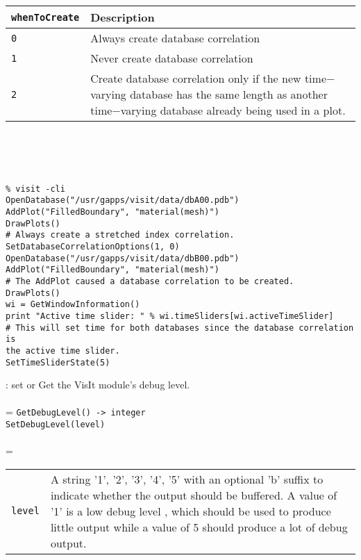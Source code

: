 \documentclass[10pt,a4paper]{report}
\begin{document}
\begin{tabular}{|l|p{9cm}|}
\hline
\verb!whenToCreate! & Description \\
\hline \hline
\verb!0! & Always create database correlation \\
\verb!1! & Never create database correlation \\
\verb!2! & Create database correlation only if the new time$-$varying database has the same length as another time$-$varying database already being used in a plot. \\
\hline
\end{tabular} \\[-2mm]
\\[-3mm] 

\\[-6mm]
\begin{verbatim}% visit -cli
OpenDatabase("/usr/gapps/visit/data/dbA00.pdb")
AddPlot("FilledBoundary", "material(mesh)")
DrawPlots()
# Always create a stretched index correlation.
SetDatabaseCorrelationOptions(1, 0)
OpenDatabase("/usr/gapps/visit/data/dbB00.pdb")
AddPlot("FilledBoundary", "material(mesh)")
# The AddPlot caused a database correlation to be created.
DrawPlots()
wi = GetWindowInformation()
print "Active time slider: " % wi.timeSliders[wi.activeTimeSlider]
# This will set time for both databases since the database correlation is
the active time slider.
SetTimeSliderState(5)
\end{verbatim}
\newpage


{}
: set or Get the VisIt module's debug level.\\[-3mm]

 \\ 
\hangindent=\parindent 
\verb!GetDebugLevel() -> integer!\\ 
\verb!SetDebugLevel(level)!\\ [-3mm]

 \\ 
\hangindent=\parindent 
\begin{tabular}{lp{9cm}}
\verb!level! & A string '1', '2', '3', '4', '5' with an optional 'b' suffix to indicate whether the output should be buffered. A value of '1' is a low debug level , which should be used to produce little output while a value of 5 should  produce a lot of debug output. \\
\end{tabular} \\[-2mm]
\end{document}
